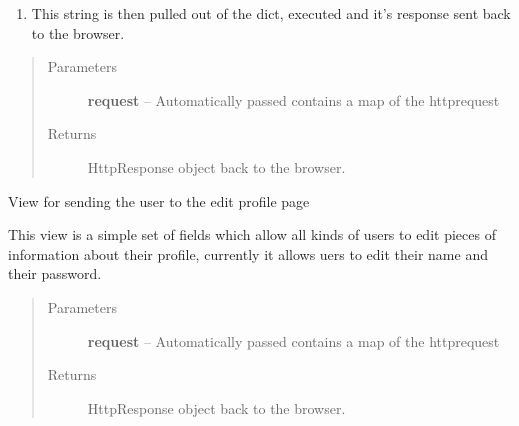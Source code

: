 \documentclass[letterpaper,10pt,english]{sphinxmanual}
\begin{document}
\begin{fulllineitems}
\begin{enumerate}
\item {} 
This string is then pulled out of the dict, executed and it's response
sent back to the browser.

\end{enumerate}
\begin{quote}\begin{description}
\item[{Parameters}] \leavevmode
\textbf{request} -- Automatically passed contains a map of the httprequest

\item[{Returns}] \leavevmode
HttpResponse object back to the browser.

\end{description}\end{quote}

\end{fulllineitems}


\begin{fulllineitems}
\label{timetracker:timetracker.views.edit_profile}
View for sending the user to the edit profile page

This view is a simple set of fields which allow all kinds of users to edit
pieces of information about their profile, currently it allows uers to
edit their name and their password.
\begin{quote}\begin{description}
\item[{Parameters}] \leavevmode
\textbf{request} -- Automatically passed contains a map of the httprequest

\item[{Returns}] \leavevmode
HttpResponse object back to the browser.

\end{description}\end{quote}

\end{fulllineitems}

\end{document}
